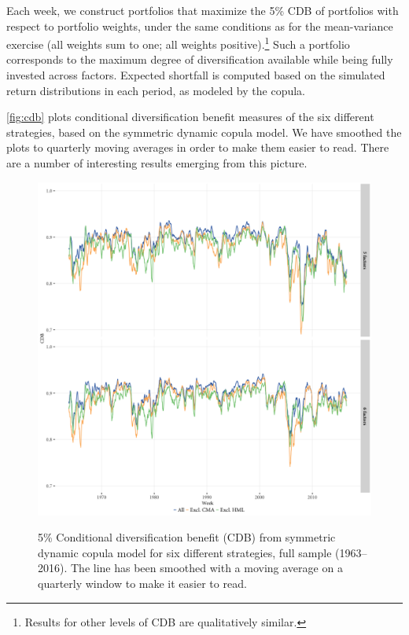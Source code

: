 Each week, we construct portfolios that maximize the 5\% CDB of portfolios with respect to portfolio weights, under the same conditions as for the mean-variance exercise (all weights sum to one; all weights positive).\footnote{Results for other levels of CDB are qualitatively similar.} Such a portfolio corresponds to the maximum degree of diversification available while being fully invested across factors. Expected shortfall is computed based on the simulated return distributions in each period, as modeled by the copula.

\autoref{fig:cdb} plots conditional diversification benefit measures of the six different strategies, based on the symmetric dynamic copula model. We have smoothed the plots to quarterly moving averages in order to make them easier to read. There are a number of interesting results emerging from this picture.

\begin{figure}
  \caption{5\% Conditional diversification benefit (CDB) from symmetric dynamic copula model for six different strategies, full sample (1963--2016). The line has been smoothed with a moving average on a quarterly window to make it easier to read.}
  \includegraphics[width=\textwidth]{graphics/cdb_5F_6F.png}
  \label{fig:cdb}
\end{figure}

